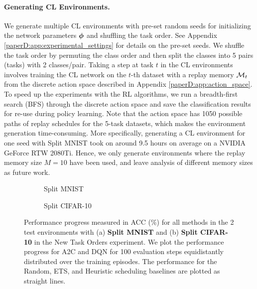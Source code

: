 \paragraph{Generating CL Environments.} We generate multiple CL environments with pre-set random seeds for initializing the network parameters ${\bm{\phi}}$ and shuffling the task order. See Appendix \ref{paperD:app:experimental_settings} for details on the pre-set seeds. 
We shuffle the task order by permuting the class order and then split the classes into 5 pairs (tasks) with 2 classes/pair. 
Taking a step at task $t$ in the CL environments involves training the CL network on the $t$-th dataset with a replay memory ${\mathcal{M}}_t$ from the discrete action space described in Appendix \ref{paperD:app:action_space}. 
To speed up the experiments with the RL algorithms, we run a breadth-first search (BFS) through the discrete action space and save the classification results for re-use during policy learning. Note that the action space has 1050 possible paths of replay schedules for the 5-task datasets, which makes the environment generation time-consuming. More specifically, generating a CL environment for one seed with Split MNIST took on around 9.5 hours on average on a NVIDIA GeForce RTW 2080Ti.   
Hence, we only generate environments where the replay memory size $M=10$ have been used, and leave analysis of different memory sizes as future work. 

\begin{figure}[t]
	\centering
	\setlength{\figwidth}{0.26\textwidth}
	\setlength{\figheight}{.14\textheight}
	\begin{subfigure}[t]{0.48\textwidth}
		\centering
		
		\vspace{-4mm} %
		\caption{Split MNIST}
		\label{fig:rewards_mnist_2envs}
	\end{subfigure}%
	\begin{subfigure}[t]{0.48\textwidth}
		\centering
		
		\caption{Split CIFAR-10}
		\label{fig:rewards_cifar10_2envs}
	\end{subfigure}
	\vspace{-2mm}
	\caption{Performance progress measured in ACC (\%) for all methods in the 2 test environments with (a) {\bf Split MNIST} and (b) {\bf Split CIFAR-10} in the New Task Orders experiment. We plot the performance progress for A2C and DQN for 100 evaluation steps equidistantly distributed over the training episodes. The performance for the Random, ETS, and Heuristic scheduling baselines are plotted as straight lines.  }
	\label{fig:rewards_new_task_orders_2envs}
	\vspace{-2mm}
\end{figure}


